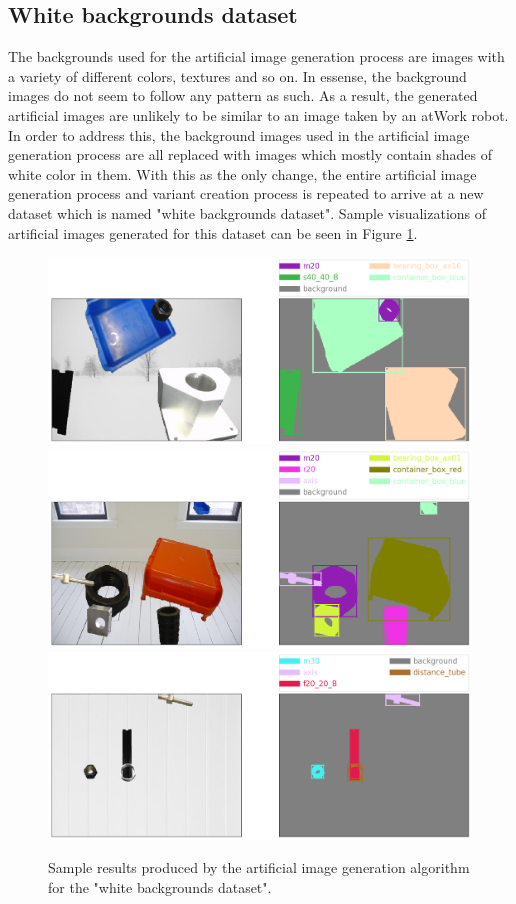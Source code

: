 	\subsection{White backgrounds dataset}
The backgrounds used for the artificial image generation process are images with a variety of different colors, textures and so on. In essense, the background images do not seem to follow any pattern as such. As a result, the generated artificial images are unlikely to be similar to an image taken by an atWork robot. In order to address this, the background images used in the artificial image generation process are all replaced with images which mostly contain shades of white color in them. With this as the only change, the entire artificial image generation process and variant creation process is repeated to arrive at a new dataset which is named "white backgrounds dataset". Sample visualizations of artificial images generated for this dataset can be seen in Figure \ref{Fig:samplewhite}.

	\begin{figure}
		\centering
		\includegraphics[scale=0.3]{images/sample_white_1}
		\includegraphics[scale=0.3]{images/sample_white_2}
		\includegraphics[scale=0.3]{images/sample_white_3}
		\caption{Sample results produced by the artificial image generation algorithm for the "white backgrounds dataset".}
		\label{Fig:samplewhite}
	\end{figure}
	
